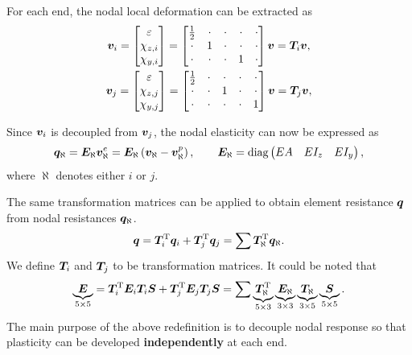 For each end, the nodal local deformation can be extracted as
\begin{gather}
\bm{v}_i=\begin{bmatrix}
\varepsilon\\\chi_{z,i}\\\chi_{y,i}
\end{bmatrix}=\begin{bmatrix}
\frac{1}{2}&\cdot&\cdot&\cdot&\cdot\\
\cdot&1&\cdot&\cdot&\cdot\\
\cdot&\cdot&\cdot&1&\cdot
\end{bmatrix}\bm{v}=\bm{T}_i\bm{v},\\
\bm{v}_j=\begin{bmatrix}
\varepsilon\\\chi_{z,j}\\\chi_{y,j}
\end{bmatrix}=\begin{bmatrix}
\frac{1}{2}&\cdot&\cdot&\cdot&\cdot\\
\cdot&\cdot&1&\cdot&\cdot\\
\cdot&\cdot&\cdot&\cdot&1
\end{bmatrix}\bm{v}=\bm{T}_j\bm{v},
\end{gather}

Since $\bm{v}_i$ is decoupled from $\bm{v}_j$, the nodal elasticity can now be expressed as
\begin{gather}
\bm{q}_\aleph=\bm{E}_\aleph\bm{v}_\aleph^e=\bm{E}_\aleph\left(\bm{v}_\aleph-\bm{v}_\aleph^p\right),\qquad\bm{E}_\aleph=\text{diag}\left(\begin{matrix}
EA&EI_z&EI_y
\end{matrix}\right),
\end{gather}
where $\aleph$ denotes either $i$ or $j$.

The same transformation matrices can be applied to obtain element resistance $\bm{q}$ from nodal resistances $\bm{q}_\aleph$.
\begin{gather}\label{nm:total_q}
\bm{q}=\bm{T}_i^{\mathrm{T}}\bm{q}_i+\bm{T}_j^{\mathrm{T}}\bm{q}_j=\sum\bm{T}_\aleph^{\mathrm{T}}\bm{q}_\aleph.
\end{gather}
We define $\bm{T}_i$ and $\bm{T}_j$ to be transformation matrices. It could be noted that
\begin{gather}
\underbrace{\bm{E}}_{5\times5}=\bm{T}_i^{\mathrm{T}}\bm{E}_i\bm{T}_i\bm{S}+\bm{T}_j^{\mathrm{T}}\bm{E}_j\bm{T}_j\bm{S}=\sum\underbrace{\bm{T}_\aleph^{\mathrm{T}}}_{5\times3}\underbrace{\bm{E}_\aleph}_{3\times3}\underbrace{\bm{T}_\aleph}_{3\times5}\underbrace{\bm{S}}_{5\times5}.
\end{gather}
The main purpose of the above redefinition is to decouple nodal response so that plasticity can be developed \textbf{independently} at each end.

